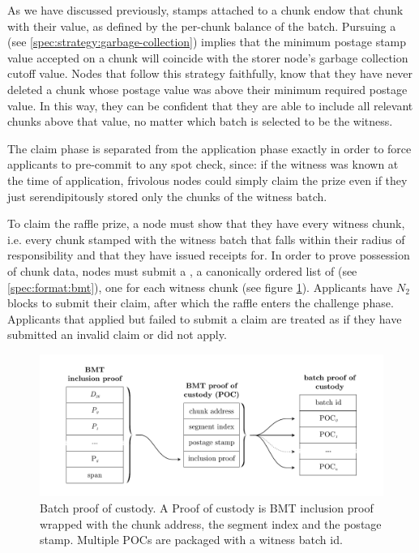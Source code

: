 As we have discussed previously, stamps attached to a chunk endow that chunk with their value, as defined by the per-chunk balance of the batch. Pursuing a  (see \ref{spec:strategy:garbage-collection}) implies that the minimum postage stamp value accepted on a chunk will coincide with the storer node's garbage collection cutoff value. Nodes that follow this strategy faithfully, know that they have never deleted a chunk whose postage value was above their minimum required postage value. In this way, they can be confident that they are able to include all relevant chunks above that value, no matter which batch is selected to be the witness.

The claim phase is separated from the application phase exactly in order to force applicants to pre-commit to any spot check, since: if the witness was known at the time of application, frivolous nodes could simply claim the prize even if they just serendipitously stored only the chunks of the witness batch.

To claim the raffle prize, a node must show that they have every witness chunk, i.e. every chunk stamped with the witness batch that falls within their radius of responsibility and that they have issued receipts for. In order to prove possession of chunk data, nodes must submit a , a canonically ordered list of  (see \ref{spec:format:bmt}), one for each witness chunk (see figure 
\ref{fig:batch-proof-of-custody}). Applicants have $N_2$ blocks to submit their claim, after which the raffle enters the challenge phase. Applicants that applied but failed to submit a claim are treated as if they have  submitted an invalid claim or did not apply.


\begin{figure}[htbp]
  \centering
   \includegraphics[width=\textwidth]{fig/batch-proof-of-custody.pdf}
  \caption[Batch proof of custody \statusgreen]{Batch proof of custody. A Proof of custody is BMT inclusion proof wrapped with the chunk address, the segment index and the postage stamp. Multiple POCs are packaged with a witness batch id.}
  \label{fig:batch-proof-of-custody}
\end{figure}

